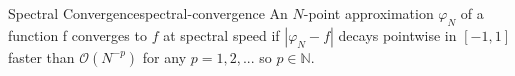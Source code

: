 \begin{definition}{Spectral Convergence}{spectral-convergence}
  An \(N\)-point approximation \(\varphi_N\) of a function f converges to \(f\) at spectral speed if \(|\varphi_N -f|\) decays pointwise in \([-1, 1]\) faster than \(\mathcal{O}(N^{-p})\) for any \(p = 1, 2, . . .\) so \(p \in \mathbb{N}\).
\end{definition}
